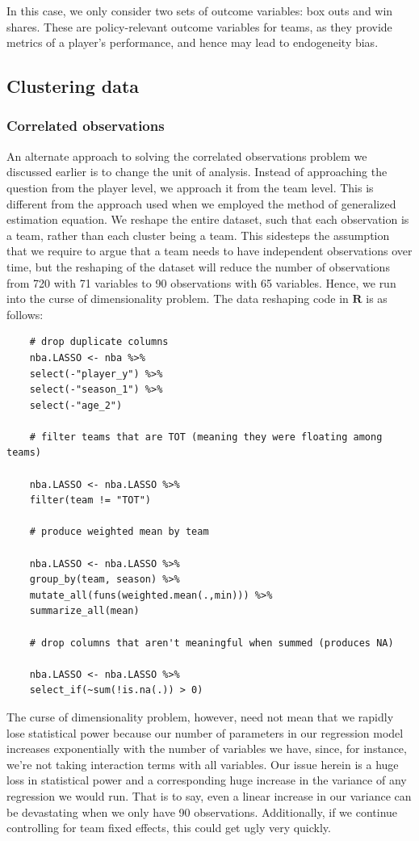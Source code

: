 \documentclass[12pt]{article}
\begin{document}
	In this case, we only consider two sets of outcome variables: box outs and win shares. These are policy-relevant outcome variables for teams, as they provide metrics of a player's performance, and hence may lead to endogeneity bias.
	
	\subsection{Clustering data}
	
	\subsubsection{Correlated observations}
	
	An alternate approach to solving the correlated observations problem we discussed earlier is to change the unit of analysis. Instead of approaching the question from the player level, we approach it from the team level. This is different from the approach used when we employed the method of generalized estimation equation. We reshape the entire dataset, such that each observation is a team, rather than each cluster being a team. This sidesteps the assumption that we require to argue that a team needs to have independent observations over time, but the reshaping of the dataset will reduce the number of observations from 720 with 71 variables to 90 observations with 65 variables. Hence, we run into the curse of dimensionality problem. The data reshaping code in $\textbf{R}$ is as follows:
	
	\begin{lstlisting}
	# drop duplicate columns
	nba.LASSO <- nba %>%
	select(-"player_y") %>%
	select(-"season_1") %>%
	select(-"age_2")
	
	# filter teams that are TOT (meaning they were floating among teams)
	
	nba.LASSO <- nba.LASSO %>%
	filter(team != "TOT")
	
	# produce weighted mean by team
	
	nba.LASSO <- nba.LASSO %>%
	group_by(team, season) %>%
	mutate_all(funs(weighted.mean(.,min))) %>%
	summarize_all(mean)
	
	# drop columns that aren't meaningful when summed (produces NA)
	
	nba.LASSO <- nba.LASSO %>%
	select_if(~sum(!is.na(.)) > 0)
	\end{lstlisting}
	
	The curse of dimensionality problem, however, need not mean that we rapidly lose statistical power because our number of parameters in our regression model increases exponentially with the number of variables we have, since, for instance, we're not taking interaction terms with all variables. Our issue herein is a huge loss in statistical power and a corresponding huge increase in the variance of any regression we would run. That is to say, even a linear increase in our variance can be devastating when we only have 90 observations. Additionally, if we continue controlling for team fixed effects, this could get ugly very quickly.
	
\end{document}
